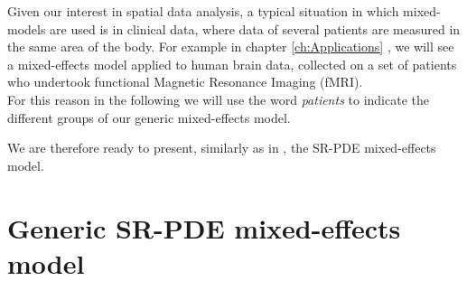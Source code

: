 Given our interest in spatial data analysis, a typical situation in which
mixed-models are used is in clinical data, where data of several patients are
measured in the same area of the body. For example in chapter
\ref{ch:Applications} , we will see a mixed-effects
model applied to human brain data, collected on a set of patients who undertook
functional Magnetic Resonance Imaging (fMRI).\\ For this reason in the
following we will use the word \textit{patients} to indicate the different
groups of our generic mixed-effects model.

We are therefore ready to present, similarly as in \cite{kim}, the SR-PDE
mixed-effects model.

\section{Generic SR-PDE mixed-effects model}

